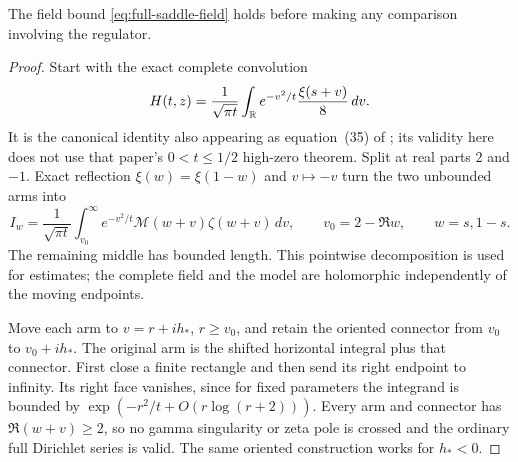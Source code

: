 \begin{lemma}\label{lem:full-saddle-field}
The field bound \eqref{eq:full-saddle-field} holds before making any
comparison involving the regulator.
\end{lemma}
\begin{proof}
Start with the exact complete convolution
\begin{equation}
 H(t,z)=\frac1{\sqrt{\pi t}}\int_\mathbb R e^{-v^2/t}\frac{\xi(s+v)}8\,dv.
 \label{eq:full-saddle-convolution}
\end{equation}
It is the canonical identity also appearing as equation~(35) of
\cite{polymath2019heat}; its validity here does not use that paper's
$0<t\le1/2$ high-zero theorem. Split at real parts $2$ and $-1$.
Exact reflection $\xi(w)=\xi(1-w)$ and $v\mapsto-v$ turn the two
unbounded arms into
\begin{equation}
 I_w=\frac1{\sqrt{\pi t}}\int_{v_0}^\infty
   e^{-v^2/t}\mathcal M(w+v)\zeta(w+v)\,dv,
 \qquad v_0=2-\Re w,\qquad w=s,1-s.
 \label{eq:full-saddle-arms}
\end{equation}
The remaining middle has bounded length. This pointwise decomposition
is used for estimates; the complete field and the model are holomorphic
independently of the moving endpoints.

Move each arm to $v=r+ih_*$, $r\ge v_0$, and retain the oriented
connector from $v_0$ to $v_0+ih_*$. The original arm is the shifted
horizontal integral plus that connector. First close a finite rectangle
and then send its right endpoint to infinity. Its right face vanishes,
since for fixed parameters the integrand is bounded by
$\exp(-r^2/t+O(r\log(r+2)))$.
Every arm and connector has $\Re(w+v)\ge2$, so no gamma singularity
or zeta pole is crossed and the ordinary full Dirichlet series is valid.
The same oriented construction works for $h_*<0$.


\end{proof}

